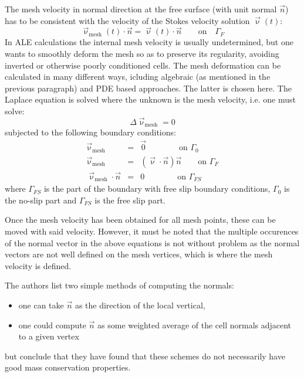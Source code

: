 The mesh velocity in normal direction at the free surface (with
unit normal $\vec{n}$) has to be consistent with the velocity of the Stokes
velocity solution $\vec{\upnu}(t)$:
\begin{equation}
\vec{\upnu}_{\text{mesh}}(t)\cdot \vec{n} = \vec{\upnu}(t)\cdot \vec{n} 
\qquad
\text{on}
\quad
\Gamma_F
\end{equation}
In ALE calculations the internal mesh velocity is usually undetermined, 
but one wants to smoothly deform the mesh so as to preserve its regularity, 
avoiding inverted or otherwise poorly conditioned cells. 
The mesh deformation can be calculated in many different ways, icluding algebraic 
(as mentioned in the previous paragraph) and PDE based approaches.
The latter is chosen here. 
The Laplace equation is solved where the unknown is the mesh velocity, i.e. 
one must solve:
\begin{equation}
\Delta \vec{\upnu}_{\text{mesh}} = 0\label{eq:fsaspect1}
\end{equation}
subjected to the following boundary conditions:
\begin{eqnarray}
\vec{\upnu}_{\text{mesh}} &=& \vec{0} \qquad\qquad \text{on } \Gamma_0 \\
\vec{\upnu}_{\text{mesh}} &=& (\vec{\upnu}\cdot\vec{n})\vec{n} \qquad \text{on } \Gamma_F \\
\vec{\upnu}_{\text{mesh}}\cdot \vec{n} &=& 0 \qquad\qquad \text{on } \Gamma_{FS} \label{eq:fsaspect2}
\end{eqnarray}
where $\Gamma_{FS}$ is the part of the boundary with free slip boundary conditions, 
$\Gamma_0$ is the no-slip part and $\Gamma_{FS}$ is the free slip part.

Once the mesh velocity has been obtained for all mesh points, these can be moved with 
said velocity. However, it must be noted that the multiple occurences of the normal vector
in the above equations is not without problem as the normal vectors are not well defined on the
mesh vertices, which is where the mesh velocity is defined.

The authors list two simple methods of computing the normals:
\begin{itemize}
\item one can take $\vec{n}$ as the direction of the local vertical,
\item one could compute $\vec{n}$ as some weighted average of the cell normals adjacent to a given
vertex
\end{itemize}
but conclude that they have found that these schemes do not necessarily
have good mass conservation properties.

